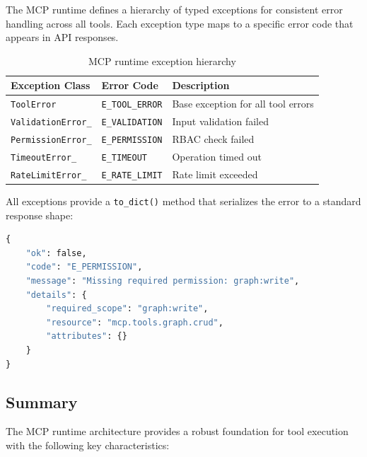 The MCP runtime defines a hierarchy of typed exceptions for consistent error handling across all tools. Each exception type maps to a specific error code that appears in API responses.

\begin{table}[htbp]
    \centering
    \caption{MCP runtime exception hierarchy}
    \label{tab:mcp-exceptions}
    \begin{tabularx}{\textwidth}{llX}
        \toprule
        \textbf{Exception Class} & \textbf{Error Code} & \textbf{Description} \\
        \midrule
        \texttt{ToolError} & \texttt{E\_TOOL\_ERROR} & Base exception for all tool errors \\
        \texttt{ValidationError\_} & \texttt{E\_VALIDATION} & Input validation failed \\
        \texttt{PermissionError\_} & \texttt{E\_PERMISSION} & RBAC check failed \\
        \texttt{TimeoutError\_} & \texttt{E\_TIMEOUT} & Operation timed out \\
        \texttt{RateLimitError\_} & \texttt{E\_RATE\_LIMIT} & Rate limit exceeded \\
        \bottomrule
    \end{tabularx}
\end{table}

All exceptions provide a \texttt{to\_dict()} method that serializes the error to a standard response shape:

\begin{lstlisting}[language=Python, caption={Standard error response shape}, label={lst:error-response}]
{
    "ok": false,
    "code": "E_PERMISSION",
    "message": "Missing required permission: graph:write",
    "details": {
        "required_scope": "graph:write",
        "resource": "mcp.tools.graph.crud",
        "attributes": {}
    }
}
\end{lstlisting}

\subsection{Summary}
\label{subsec:mcp-runtime-summary}

The MCP runtime architecture provides a robust foundation for tool execution with the following key characteristics:

